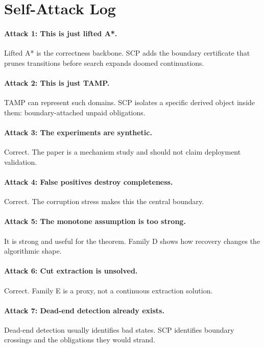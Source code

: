 \documentclass{article}
\begin{document}
\section{Self-Attack Log}

\paragraph{Attack 1: This is just lifted A*.}
Lifted A* is the correctness backbone. SCP adds the boundary certificate that prunes transitions before search expands doomed continuations.

\paragraph{Attack 2: This is just TAMP.}
TAMP can represent such domains. SCP isolates a specific derived object inside them: boundary-attached unpaid obligations.

\paragraph{Attack 3: The experiments are synthetic.}
Correct. The paper is a mechanism study and should not claim deployment validation.

\paragraph{Attack 4: False positives destroy completeness.}
Correct. The corruption stress makes this the central boundary.

\paragraph{Attack 5: The monotone assumption is too strong.}
It is strong and useful for the theorem. Family D shows how recovery changes the algorithmic shape.

\paragraph{Attack 6: Cut extraction is unsolved.}
Correct. Family E is a proxy, not a continuous extraction solution.

\paragraph{Attack 7: Dead-end detection already exists.}
Dead-end detection usually identifies bad states. SCP identifies boundary crossings and the obligations they would strand.
\end{document}
